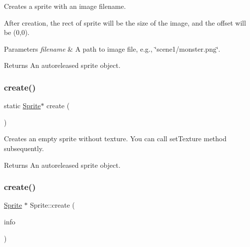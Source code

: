 Creates a sprite with an image filename.

After creation, the rect of sprite will be the size of the image, and the offset will be (0,0).


\begin{DoxyParams}{Parameters}
{\em filename} & A path to image file, e.\+g., \char`\"{}scene1/monster.\+png\char`\"{}. \\
\hline
\end{DoxyParams}
\begin{DoxyReturn}{Returns}
An autoreleased sprite object. 
\end{DoxyReturn}
\mbox{\label{classSprite_a3f75a553fe02f3de82042e81b76da010}} 
\subsubsection{\texorpdfstring{create()}{create()}\hspace{0.1cm}{\footnotesize\ttfamily [3/8]}}
{\footnotesize\ttfamily static \hyperlink{classSprite}{Sprite}$\ast$ create (\begin{DoxyParamCaption}{ }\end{DoxyParamCaption})}

Creates an empty sprite without texture. You can call set\+Texture method subsequently.

\begin{DoxyReturn}{Returns}
An autoreleased sprite object. 
\end{DoxyReturn}
\mbox{\label{classSprite_af99c68d85cd5be179a37d7dbf59f7bf7}} 
\subsubsection{\texorpdfstring{create()}{create()}\hspace{0.1cm}{\footnotesize\ttfamily [4/8]}}
{\footnotesize\ttfamily \hyperlink{classSprite}{Sprite} $\ast$ Sprite\+::create (\begin{DoxyParamCaption}\item[{const \hyperlink{classPolygonInfo}{Polygon\+Info} \&}]{info }\end{DoxyParamCaption})\hspace{0.3cm}{\ttfamily [static]}}

